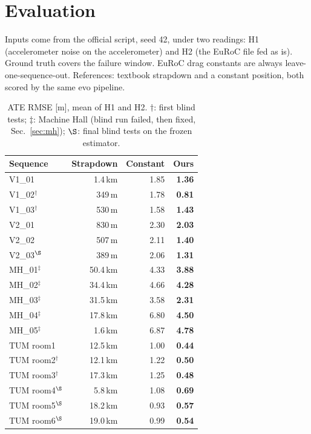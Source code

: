 \documentclass[10pt,a4paper,twocolumn]{article}
\begin{document}
\section{Evaluation}
Inputs come from the official script, seed 42, under two readings: H1 (accelerometer noise on the accelerometer) and H2 (the EuRoC file fed as is). Ground truth covers the failure window. EuRoC drag constants are always leave-one-sequence-out. References: textbook strapdown and a constant position, both scored by the same evo pipeline.

\begin{table}[!htb]\centering\small
\caption{ATE RMSE [m], mean of H1 and H2. $\dagger$: first blind tests; $\ddagger$: Machine Hall (blind run failed, then fixed, Sec.~\ref{sec:mh}); $\S$: final blind tests on the frozen estimator.}
\begin{tabular}{lrrr}\toprule
Sequence & Strapdown & Constant & \textbf{Ours}\\\midrule
V1\_01 & 1.4\,km & 1.85 & \textbf{1.36}\\
V1\_02$^\dagger$ & 349\,m & 1.78 & \textbf{0.81}\\
V1\_03$^\dagger$ & 530\,m & 1.58 & \textbf{1.43}\\
V2\_01 & 830\,m & 2.30 & \textbf{2.03}\\
V2\_02 & 507\,m & 2.11 & \textbf{1.40}\\
V2\_03$^\S$ & 389\,m & 2.06 & \textbf{1.31}\\
MH\_01$^\ddagger$ & 50.4\,km & 4.33 & \textbf{3.88}\\
MH\_02$^\ddagger$ & 34.4\,km & 4.66 & \textbf{4.28}\\
MH\_03$^\ddagger$ & 31.5\,km & 3.58 & \textbf{2.31}\\
MH\_04$^\ddagger$ & 17.8\,km & 6.80 & \textbf{4.50}\\
MH\_05$^\ddagger$ & 1.6\,km & 6.87 & \textbf{4.78}\\
TUM room1 & 12.5\,km & 1.00 & \textbf{0.44}\\
TUM room2$^\dagger$ & 12.1\,km & 1.22 & \textbf{0.50}\\
TUM room3$^\dagger$ & 17.3\,km & 1.25 & \textbf{0.48}\\
TUM room4$^\S$ & 5.8\,km & 1.08 & \textbf{0.69}\\
TUM room5$^\S$ & 18.2\,km & 0.93 & \textbf{0.57}\\
TUM room6$^\S$ & 19.0\,km & 0.99 & \textbf{0.54}\\\bottomrule
\end{tabular}\label{tab:main}\end{table}
\end{document}
